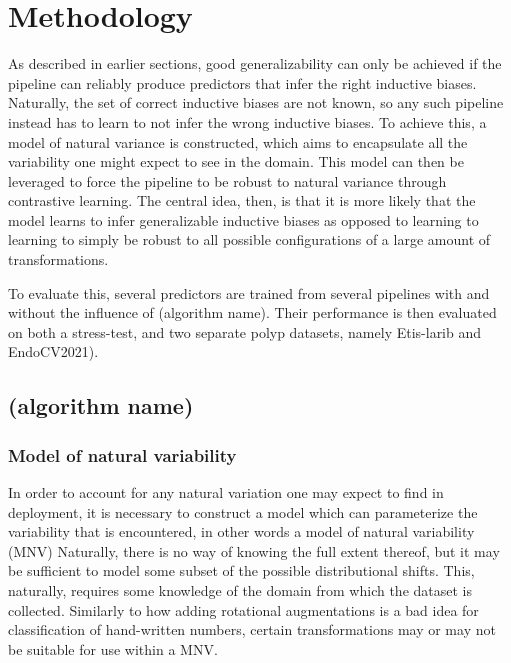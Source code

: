 \chapter{Methodology}
\setcounter{chapter}{3}
    As described in earlier sections, good generalizability can only be achieved if the pipeline can reliably produce predictors that infer the right inductive biases. Naturally, the set of correct inductive biases are not known, so any such pipeline instead has to learn to not infer the wrong inductive biases. To achieve this, a model of natural variance is constructed, which aims to encapsulate all the variability one might expect to see in the domain. This model can then be leveraged to force the pipeline to be robust to natural variance through contrastive learning.  The central idea, then, is that it is more likely that the model learns to infer generalizable inductive biases as opposed to learning to learning to simply be robust to all possible configurations of a large amount of transformations. 
	
	To evaluate this, several predictors are trained from several pipelines with and without the influence of (algorithm name). Their performance is then evaluated on both a stress-test, and two separate polyp datasets, namely Etis-larib and EndoCV2021). 
\section{(algorithm name)}

  	\subsection{Model of natural variability}
  		In order to account for any natural variation one may expect to find in deployment, it is necessary to construct a model which can parameterize the variability that is encountered, in other words a model of natural variability (MNV) Naturally, there is no way of knowing the full extent thereof, but it may be sufficient to model some subset of the possible distributional shifts. This, naturally, requires some knowledge of the domain from which the dataset is collected. Similarly to how adding rotational augmentations is a bad idea for classification of hand-written numbers, certain transformations may or may not be suitable for use within a MNV.
  		
